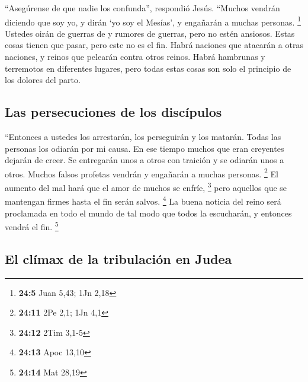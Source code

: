 ``Asegúrense de que nadie los confunda'', respondió
Jesús.  ``Muchos vendrán diciendo que soy yo, y dirán `yo
soy el Mesías', y engañarán a muchas personas. \footnote{\textbf{24:5}
  Juan 5,43; 1Jn 2,18}  Ustedes oirán de guerras de y
rumores de guerras, pero no estén ansiosos. Estas cosas tienen que
pasar, pero este no es el fin.  Habrá naciones que
atacarán a otras naciones, y reinos que pelearán contra otros reinos.
Habrá hambrunas y terremotos en diferentes lugares,  pero
todas estas cosas son solo el principio de los dolores del parto.

\hypertarget{las-persecuciones-de-los-discuxedpulos}{%
\subsection{Las persecuciones de los
discípulos}\label{las-persecuciones-de-los-discuxedpulos}}

 ``Entonces a ustedes los arrestarán, los perseguirán y
los matarán. Todas las personas los odiarán por mi causa.
 En ese tiempo muchos que eran creyentes dejarán de
creer. Se entregarán unos a otros con traición y se odiarán unos a
otros.  Muchos falsos profetas vendrán y engañarán a
muchas personas. \footnote{\textbf{24:11} 2Pe 2,1; 1Jn 4,1}
 El aumento del mal hará que el amor de muchos se enfríe,
\footnote{\textbf{24:12} 2Tim 3,1-5}  pero aquellos que
se mantengan firmes hasta el fin serán salvos. \footnote{\textbf{24:13}
  Apoc 13,10}  La buena noticia del reino será proclamada
en todo el mundo de tal modo que todos la escucharán, y entonces vendrá
el fin. \footnote{\textbf{24:14} Mat 28,19}

\hypertarget{el-cluxedmax-de-la-tribulaciuxf3n-en-judea}{%
\subsection{El clímax de la tribulación en
Judea}\label{el-cluxedmax-de-la-tribulaciuxf3n-en-judea}}

